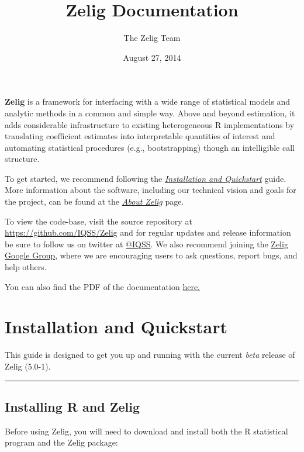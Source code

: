 \documentclass[letterpaper,10pt,english]{sphinxmanual}
\title{Zelig Documentation}
\date{August 27, 2014}
\author{The Zelig Team}
\begin{document}
\maketitle
\tableofcontents
{}\label{index::doc}


\textbf{Zelig} is a framework for interfacing with a wide range of statistical models and analytic methods in a common and simple way. Above and beyond estimation, it adds considerable infrastructure to existing heterogeneous R implementations by translating coefficient estimates into interpretable quantities of interest and automating statistical procedures (e.g., bootstrapping) though an intelligible call structure.

To get started, we recommend following the {\hyperref[installation_quickstart:installation-quickstart]{\emph{Installation and Quickstart}}} guide. More information about the software, including our technical vision and goals for the project, can be found at the {\hyperref[about:about]{\emph{About Zelig}}} page.

To view the code-base, visit the source repository at \href{https://github.com/IQSS/Zelig}{https://github.com/IQSS/Zelig} and for regular updates  and release information be sure to follow us on twitter at \href{https://twitter.com/IQSS}{@IQSS}. We also recommend joining the \href{https://groups.google.com/forum/\#!forum/zelig-statistical-software}{Zelig Google Group}, where we are encouraging users to ask questions, report bugs, and help others.

You can also find the PDF of the documentation \href{http://zeligproject.org/build/latex/Zelig.pdf}{here.}


\chapter{Installation and Quickstart}
\label{installation_quickstart::doc}\label{installation_quickstart:welcome-to-zelig}\label{installation_quickstart:installation-and-quickstart}\label{installation_quickstart:installation-quickstart}
This guide is designed to get you up and running with the current \emph{beta} release of Zelig (5.0-1).


\bigskip\hrule{}\bigskip



\section{Installing R and Zelig}
\label{installation_quickstart:installing-r-and-zelig}
Before using Zelig, you will need to download and install both the R statistical program and the Zelig package:
\end{document}
